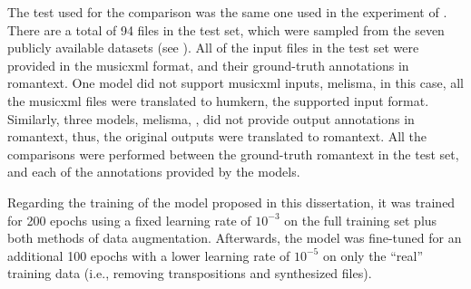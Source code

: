 
The test used for the comparison was the same one used in
the experiment of .
There are a total of 94 files in the test set, which were
sampled from the seven publicly available datasets (see
). All of the input files
in the test set were provided in the \gls{musicxml} format,
and their ground-truth annotations in \gls{romantext}. One
model did not support \gls{musicxml} inputs, \gls{melisma},
in this case, all the \gls{musicxml} files were translated
to \gls{humkern}, the supported input format. Similarly,
three models, \gls{melisma}, \textcite{chen2021attend,
mcleod2021modular}, did not provide output annotations in
\gls{romantext}, thus, the original outputs were translated
to \gls{romantext}. All the comparisons were performed
between the ground-truth \gls{romantext} in the test set,
and each of the annotations provided by the models. 

Regarding the training of the model proposed in this
dissertation, it was trained for 200 epochs using a fixed
learning rate of $10^{-3}$ on the full training set plus
both methods of data augmentation. Afterwards, the model was
fine-tuned for an additional 100 epochs with a lower
learning rate of $10^{-5}$ on only the ``real'' training
data (i.e., removing transpositions and synthesized files).


